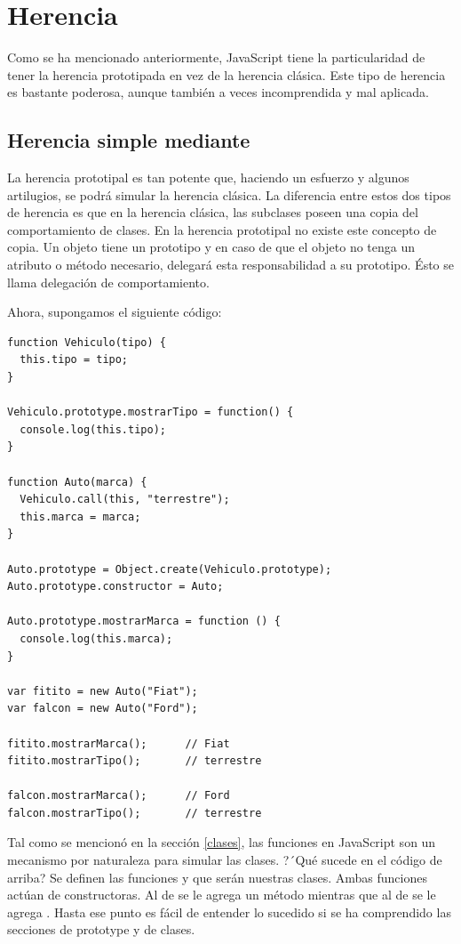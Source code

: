 \section{Herencia}
\label{herencia}

Como se ha mencionado anteriormente, JavaScript tiene la particularidad de tener la herencia prototipada en vez de la herencia clásica. Este tipo de herencia es bastante poderosa, aunque también a veces incomprendida y mal aplicada.

\subsection{Herencia simple mediante }

La herencia prototipal es tan potente que, haciendo un esfuerzo y algunos artilugios, se podrá simular la herencia clásica. La diferencia entre estos dos tipos de herencia es que en la herencia clásica, las subclases poseen una copia del comportamiento de clases. En la herencia prototipal no existe este concepto de copia. Un objeto tiene un prototipo y en caso de que el objeto no tenga un atributo o método necesario, delegará esta responsabilidad a su prototipo. Ésto se llama delegación de comportamiento.

Ahora, supongamos el siguiente código:

\begin{lstlisting}[title={Analizando herencia prototipal en JS}]
function Vehiculo(tipo) {
  this.tipo = tipo;
}

Vehiculo.prototype.mostrarTipo = function() {
  console.log(this.tipo);
}

function Auto(marca) {
  Vehiculo.call(this, "terrestre");
  this.marca = marca;
}

Auto.prototype = Object.create(Vehiculo.prototype);
Auto.prototype.constructor = Auto;

Auto.prototype.mostrarMarca = function () {
  console.log(this.marca);
}

var fitito = new Auto("Fiat");
var falcon = new Auto("Ford");
 
fitito.mostrarMarca();      // Fiat
fitito.mostrarTipo();       // terrestre

falcon.mostrarMarca();      // Ford
falcon.mostrarTipo();       // terrestre
\end{lstlisting}

Tal como se mencionó en la sección \ref{clases}, las funciones en JavaScript son un mecanismo por naturaleza para simular las clases. ?´Qué sucede en el código de arriba? Se definen las funciones  y  que serán nuestras clases. Ambas funciones actúan de constructoras. Al \code{[[Prototype]]} de  se le agrega un método  mientras que al \code{[[Prototype]]} de  se le agrega . Hasta ese punto es fácil de entender lo sucedido si se ha comprendido las secciones de prototype y de clases. 

